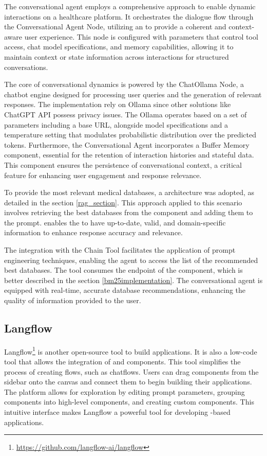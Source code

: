 The conversational agent employs a comprehensive approach to enable dynamic interactions on a healthcare {\ir} platform. It orchestrates the dialogue flow through the Conversational Agent Node, utilizing an {\llm} to provide a coherent and context-aware user experience. This node is configured with parameters that control tool access, chat model specifications, and memory capabilities, allowing it to maintain context or state information across interactions for structured conversations.

The core of conversational dynamics is powered by the ChatOllama Node, a chatbot engine designed for processing user queries and the generation of relevant responses. The implementation rely on Ollama since other solutions like ChatGPT API possess privacy issues. The Ollama operates based on a set of parameters including a base URL, alongside model specifications and a temperature setting that modulates probabilistic distribution over the predicted tokens. Furthermore, the Conversational Agent incorporates a Buffer Memory component, essential for the retention of interaction histories and stateful data. This component ensures the persistence of conversational context, a critical feature for enhancing user engagement and response relevance.

To provide the most relevant medical databases, a {\rag} architecture was adopted, as detailed in the section \ref{rag_section}. This approach applied to this scenario involves retrieving the best databases from the {\ir} component and adding them to the {\llm} prompt. {\rag} enables the {\llm} to have up-to-date, valid, and domain-specific information to enhance response accuracy and relevance. 

The integration with the Chain Tool facilitates the application of prompt engineering techniques, enabling the agent to access the list of the recommended best databases. The tool consumes the endpoint of the {\ir} component, which is better described in the section \ref{bm25implementation}. The conversational agent is equipped with real-time, accurate database recommendations, enhancing the quality of information provided to the user. 


\subsection{Langflow}

Langflow\footnote{\url{https://github.com/langflow-ai/langflow}} is another open-source tool to build {\ai} applications. It is also a low-code tool that allows the integration of {\llm} and {\ai} components. This tool simplifies the process of creating flows, such as chatflows. Users can drag components from the sidebar onto the canvas and connect them to begin building their applications. The platform allows for exploration by editing prompt parameters, grouping components into high-level components, and creating custom components. This intuitive interface makes Langflow a powerful tool for developing {\llm}-based applications.

